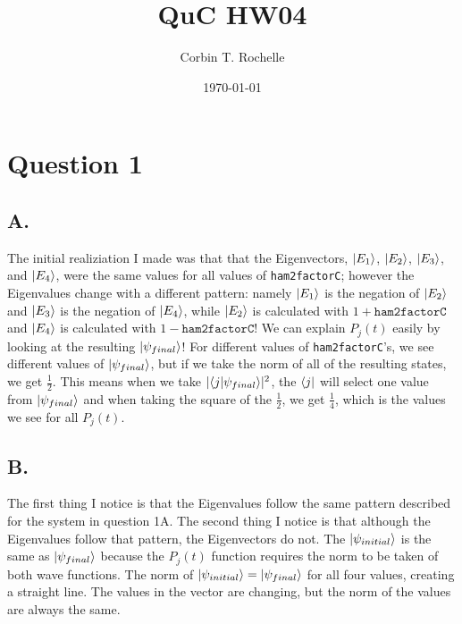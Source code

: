 \documentclass[12pt]{article}
\author{Corbin T. Rochelle}
\title{QuC HW04}
\date{\today}
\begin{document}
\maketitle

\section*{Question 1}
\subsection*{A.}
The initial realiziation I made was that that the Eigenvectors, $\ket{E_1}$, $\ket{E_2}$, $\ket{E_3}$, and $\ket{E_4}$, were the same values for all values of \texttt{ham2factorC};
however the Eigenvalues change with a different pattern: namely $\ket{E_1}$ is the negation of $\ket{E_2}$ and $\ket{E_3}$ is the negation of $\ket{E_4}$, while $\ket{E_2}$ is calculated with $1+\texttt{ham2factorC}$ and $\ket{E_4}$ is calculated with $1-\texttt{ham2factorC}$!
We can explain $P_j(t)$ easily by looking at the resulting $\ket{\psi_{final}}$!
For different values of \texttt{ham2factorC}'s, we see different values of $\ket{\psi_{final}}$, but if we take the norm of all of the resulting states, we get $\frac{1}{2}$. 
This means when we take $\lvert\bra{j}\ket{\psi_{final}}\rvert^2$, the $\bra{j}$ will select one value from $\ket{\psi_{final}}$ and when taking the square of the $\frac{1}{2}$, we get $\frac{1}{4}$, which is the values we see for all $P_j(t)$.
\subsection*{B.}
The first thing I notice is that the Eigenvalues follow the same pattern described for the system in question 1A. 
The second thing I notice is that although the Eigenvalues follow that pattern, the Eigenvectors do not. 
The $\ket{\psi_{initial}}$ is the same as $\ket{\psi_{final}}$ because the $P_j(t)$ function requires the norm to be taken of both wave functions. 
The norm of $\ket{\psi_{initial}}=\ket{\psi_{final}}$ for all four values, creating a straight line.
The values in the vector are changing, but the norm of the values are always the same. 
\end{document}
